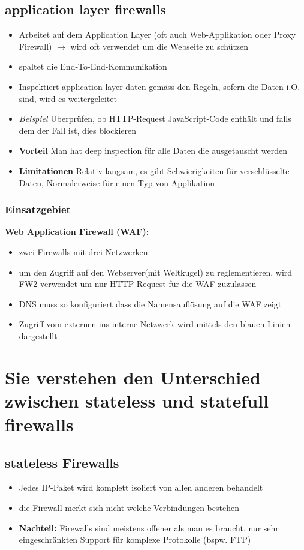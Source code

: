 \documentclass{report}
\theoremstyle{definition}
\theoremstyle{example}
\begin{document}
	\subsection{application layer firewalls}
\begin{itemize}
	\item Arbeitet auf dem Application Layer (oft auch Web-Applikation oder Proxy Firewall) $\rightarrow$ wird oft verwendet um die Webseite zu schützen
	\item spaltet die End-To-End-Kommunikation
	\item Inspektiert application layer daten gemäss den Regeln, sofern die Daten i.O. sind, wird es weitergeleitet
	\item \textit{Beispiel} Überprüfen, ob HTTP-Request JavaScript-Code enthält und falls dem der Fall ist, dies blockieren
	\item \textbf{Vorteil} Man hat deep inspection für alle Daten die ausgetauscht werden
	\item \textbf{Limitationen} Relativ langsam, es gibt Schwierigkeiten für verschlüsselte Daten, Normalerweise für einen Typ von Applikation
\end{itemize}

		\subsubsection{Einsatzgebiet}
\textbf{Web Application Firewall (WAF)}:
\begin{itemize}
	\item zwei Firewalls mit drei Netzwerken
	\item um den Zugriff auf den Webserver(mit Weltkugel) zu reglementieren, wird FW2 verwendet um nur HTTP-Request für die WAF zuzulassen
	\item DNS muss so konfiguriert dass die Namensauflösung auf die WAF zeigt
	\item Zugriff vom externen ins interne Netzwerk wird mittels den blauen Linien dargestellt
\end{itemize}



\section{Sie verstehen den Unterschied zwischen stateless und statefull firewalls}

	\subsection{stateless Firewalls}
\begin{itemize}
	\item Jedes IP-Paket wird komplett isoliert von allen anderen behandelt
	\item die Firewall merkt sich nicht welche Verbindungen bestehen
	\item \textbf{Nachteil:} Firewalls sind meistens offener als man es braucht, nur sehr eingeschränkten Support für komplexe Protokolle (bspw. FTP)
\end{itemize}
\end{document}
